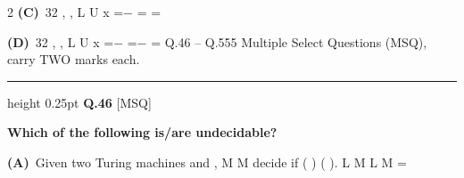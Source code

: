 \documentclass[a4paper,10pt,twoside]{article}
\begin{document}
\begin{multicols}{2}
\textbf{(C)}~32    , ,   \newline L \newline U \newline x \newline =− \newline = \newline =\par\vspace{2pt}\noindent
\textbf{(D)}~32     \newline , \newline ,    \newline L \newline U \newline x \newline =− \newline =− \newline = \newline Q.46 -- Q.555 Multiple Select Questions (MSQ), carry TWO marks each.
\par\vspace{6pt}\hrule height 0.25pt\vspace{6pt}
\noindent\textbf{Q.46} \hfill {\footnotesize\textsf{[MSQ]}}
\par\vspace{2pt}
{\bfseries Which of the following is/are undecidable? \par}
\par\vspace{2pt}\noindent
\textbf{(A)}~Given two Turing machines   \newline and \newline , \newline M \newline M \newline decide if   \newline ( \newline ) \newline ( \newline ). \newline L M \newline L M \newline =\par\vspace{2pt}\noindent

\end{multicols}
\end{document}
